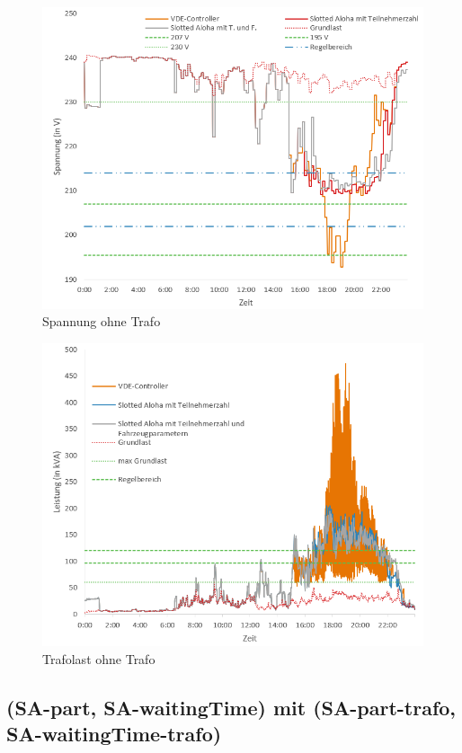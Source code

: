 \begin{figure}[htb]
\centering
	\includegraphics[scale=0.7]{img/ohneTrafo/Spannung2.png}
	\caption{Spannung ohne Trafo}
	\label{Abb_oTSpannung}
\end{figure}

\begin{figure}[htb]
\centering
	\includegraphics[scale=0.7]{img/ohneTrafo/TrafoLast3.png}
	\caption{Trafolast ohne Trafo}
	\label{Abb_oTTrafo}
\end{figure}

\subsection{(SA-part, SA-waitingTime) mit (SA-part-trafo, SA-waitingTime-trafo)}
